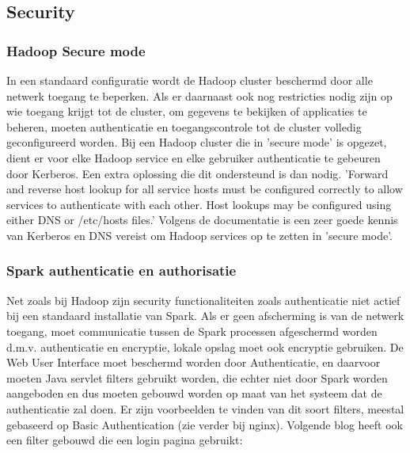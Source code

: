 \subsection{Security}

\subsubsection{Hadoop Secure mode} \autocite{Hadoop2023}
In een standaard configuratie wordt de Hadoop cluster beschermd door alle netwerk toegang te beperken. Als er daarnaast ook nog restricties nodig zijn op wie toegang krijgt tot de cluster, om gegevens te bekijken of applicaties te beheren, moeten authenticatie en toegangscontrole tot de cluster volledig geconfigureerd worden. Bij een Hadoop cluster die in 'secure mode' is opgezet, dient er voor elke Hadoop service en elke gebruiker authenticatie te gebeuren door Kerberos. Een extra oplossing die dit ondersteund is dan nodig.
\newline
\newline
'Forward and reverse host lookup for all service hosts must be configured correctly to allow services to authenticate with each other. Host lookups may be configured using either DNS or /etc/hosts files.'\autocite{Hadoop2023a}
\newline
\newline
Volgens de documentatie is een zeer goede kennis van Kerberos en DNS vereist om Hadoop services op te zetten in 'secure mode'.
\newline
\newline
\subsubsection {Spark authenticatie en authorisatie} \autocite{Spark2023c}
Net zoals bij Hadoop zijn security functionaliteiten zoals authenticatie niet actief bij een standaard installatie van Spark. Als er geen afscherming is van de netwerk toegang, moet communicatie tussen de Spark processen afgeschermd worden d.m.v. authenticatie en encryptie, lokale opslag moet ook encryptie gebruiken. De Web User Interface moet beschermd worden door Authenticatie, en daarvoor moeten Java servlet filters gebruikt worden, die echter niet door Spark worden aangeboden en dus moeten gebouwd worden op maat van het systeem dat de authenticatie zal doen.
Er zijn voorbeelden te vinden van dit soort filters, meestal gebaseerd op Basic Authentication (zie verder bij nginx). Volgende blog heeft ook een filter gebouwd die een login pagina gebruikt: \textcite{Cacoveanu2019}
\newline
\newline

